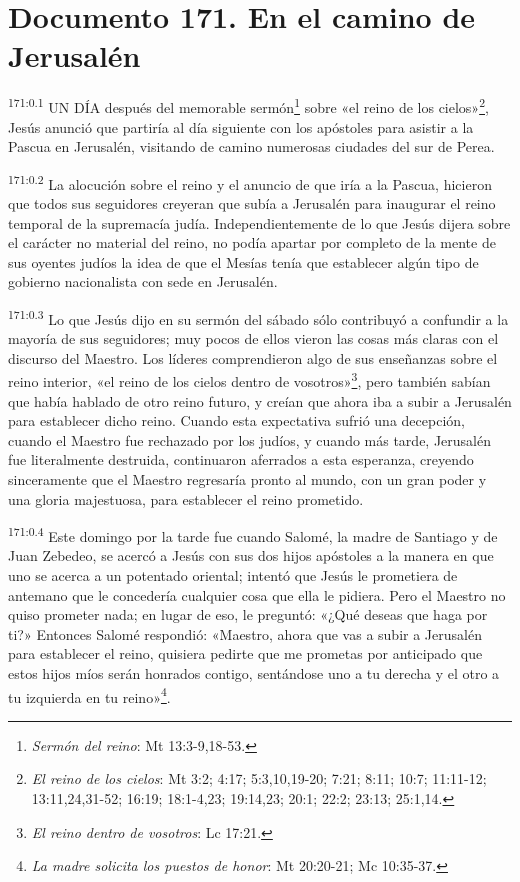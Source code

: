 \chapter{Documento 171. En el camino de Jerusalén}
\par 
\textsuperscript{171:0.1} UN DÍA después del memorable sermón\footnote{\textit{Sermón del reino}: Mt 13:3-9,18-53.} sobre «el reino de los cielos»\footnote{\textit{El reino de los cielos}: Mt 3:2; 4:17; 5:3,10,19-20; 7:21; 8:11; 10:7; 11:11-12; 13:11,24,31-52; 16:19; 18:1-4,23; 19:14,23; 20:1; 22:2; 23:13; 25:1,14.}, Jesús anunció que partiría al día siguiente con los apóstoles para asistir a la Pascua en Jerusalén, visitando de camino numerosas ciudades del sur de Perea.

\par 
\textsuperscript{171:0.2} La alocución sobre el reino y el anuncio de que iría a la Pascua, hicieron que todos sus seguidores creyeran que subía a Jerusalén para inaugurar el reino temporal de la supremacía judía. Independientemente de lo que Jesús dijera sobre el carácter no material del reino, no podía apartar por completo de la mente de sus oyentes judíos la idea de que el Mesías tenía que establecer algún tipo de gobierno nacionalista con sede en Jerusalén.

\par 
\textsuperscript{171:0.3} Lo que Jesús dijo en su sermón del sábado sólo contribuyó a confundir a la mayoría de sus seguidores; muy pocos de ellos vieron las cosas más claras con el discurso del Maestro. Los líderes comprendieron algo de sus enseñanzas sobre el reino interior, «el reino de los cielos dentro de vosotros»\footnote{\textit{El reino dentro de vosotros}: Lc 17:21.}, pero también sabían que había hablado de otro reino futuro, y creían que ahora iba a subir a Jerusalén para establecer dicho reino. Cuando esta expectativa sufrió una decepción, cuando el Maestro fue rechazado por los judíos, y cuando más tarde, Jerusalén fue literalmente destruida, continuaron aferrados a esta esperanza, creyendo sinceramente que el Maestro regresaría pronto al mundo, con un gran poder y una gloria majestuosa, para establecer el reino prometido.

\par 
\textsuperscript{171:0.4} Este domingo por la tarde fue cuando Salomé, la madre de Santiago y de Juan Zebedeo, se acercó a Jesús con sus dos hijos apóstoles a la manera en que uno se acerca a un potentado oriental; intentó que Jesús le prometiera de antemano que le concedería cualquier cosa que ella le pidiera. Pero el Maestro no quiso prometer nada; en lugar de eso, le preguntó: «¿Qué deseas que haga por ti?» Entonces Salomé respondió: «Maestro, ahora que vas a subir a Jerusalén para establecer el reino, quisiera pedirte que me prometas por anticipado que estos hijos míos serán honrados contigo, sentándose uno a tu derecha y el otro a tu izquierda en tu reino»\footnote{\textit{La madre solicita los puestos de honor}: Mt 20:20-21; Mc 10:35-37.}.

